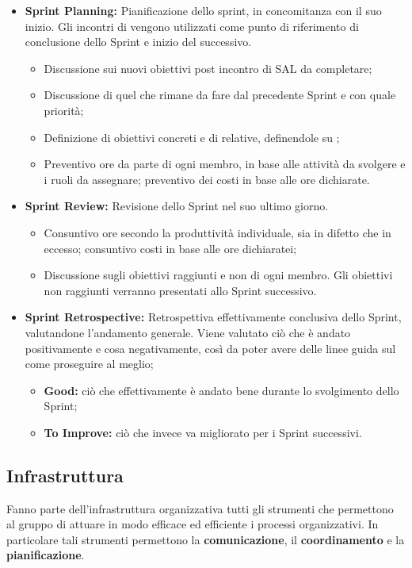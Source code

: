 \begin{itemize}
  \item \textbf{Sprint Planning:} Pianificazione dello sprint, in concomitanza con il suo inizio.
      Gli incontri di  vengono utilizzati come punto di riferimento di conclusione
        dello Sprint e inizio del successivo.
  \begin{itemize}
    \item Discussione sui nuovi obiettivi post incontro di SAL da completare;
    \item Discussione di quel che rimane da fare dal precedente Sprint e con quale priorità;
    \item Definizione di obiettivi concreti e di  relative, definendole su
        ;
    \item Preventivo ore da parte di ogni membro, in base alle attività da svolgere e i ruoli da assegnare; preventivo dei costi in base alle ore dichiarate.
  \end{itemize}
  \item \textbf{Sprint Review:} Revisione dello Sprint nel suo ultimo giorno.
  \begin{itemize}
    \item Consuntivo ore secondo la produttività individuale, sia in difetto che in eccesso;
        consuntivo costi in base alle ore dichiaratei;
    \item Discussione sugli obiettivi raggiunti e non di ogni membro. Gli obiettivi non raggiunti verranno presentati allo Sprint successivo.
  \end{itemize}
  \item \textbf{Sprint Retrospective:} Retrospettiva effettivamente conclusiva dello Sprint,
      valutandone l'andamento generale. Viene valutato ciò che è andato positivamente e cosa
        negativamente, così da poter avere delle linee guida sul come proseguire al meglio;
  \begin{itemize}
      \item \textbf{Good:} ciò che effettivamente è andato bene durante lo svolgimento dello Sprint;
      \item \textbf{To Improve:} ciò che invece va migliorato per i Sprint successivi.
  \end{itemize}
\end{itemize} 
\subsection{Infrastruttura}\label{sec:infrastruttura}
Fanno parte dell'infrastruttura organizzativa tutti gli strumenti che permettono al gruppo di attuare in modo efficace ed efficiente i processi organizzativi. In particolare tali strumenti permettono la \textbf{comunicazione}, il \textbf{coordinamento} e la \textbf{pianificazione}.

